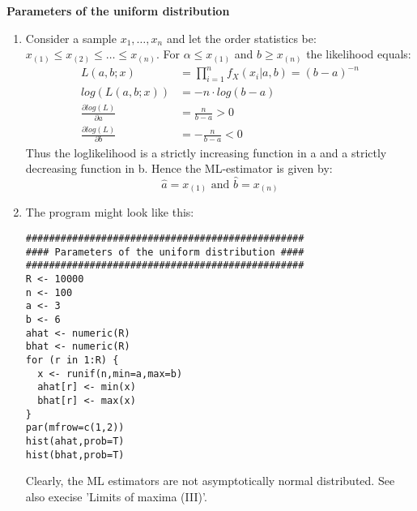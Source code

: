 \begin{Solution}{12.2}
\textbf{Parameters of the uniform distribution}
\begin{enumerate}
  \item Consider a sample $x_1,\dots,x_n$ and let the order statistics
      be: $x_{(1)} \leq x_{(2)} \leq \dots \leq x_{(n)}$. For $\alpha
      \leq x_{(1)}$ and $b \geq x_{(n)}$ the likelihood equals:
      \begin{align*}
        L(a,b;x) &= \prod_{i=1}^n f_X(x_i|a,b) = (b-a)^{-n}\\
        log(L(a,b;x)) &= -n\cdot log(b-a)\\
        \frac{\partial log(L)}{\partial a} &= \frac{n}{b-a} >0\\
        \frac{\partial log(L)}{\partial b} &= -\frac{n}{b-a} <0
      \end{align*}
      Thus the loglikelihood is a strictly increasing function in a and a
      strictly decreasing function in b. Hence the ML-estimator is given
      by:
      \begin{equation*}
        \hat{a} = x_{(1)} \text{ and }\hat{b} = x_{(n)}
      \end{equation*}
  \item The program might look like this:
\begin{verbatim}
################################################
#### Parameters of the uniform distribution ####
################################################
R <- 10000
n <- 100
a <- 3
b <- 6
ahat <- numeric(R)
bhat <- numeric(R)
for (r in 1:R) {
  x <- runif(n,min=a,max=b)
  ahat[r] <- min(x)
  bhat[r] <- max(x)
}
par(mfrow=c(1,2))
hist(ahat,prob=T)
hist(bhat,prob=T)
\end{verbatim}
Clearly, the ML estimators are not asymptotically normal distributed. See also execise 'Limits of maxima (III)'.
\end{enumerate}
\end{Solution}
